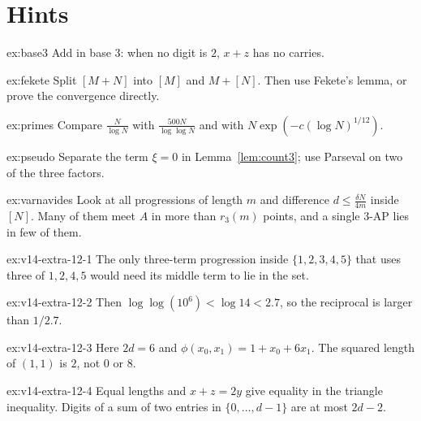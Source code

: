 \section{Hints}

\begin{hint}{ex:base3}
Add in base $3$: when no digit is $2$, $x+z$ has no carries.
\end{hint}

\begin{hint}{ex:fekete}
Split $[M+N]$ into $[M]$ and $M+[N]$. Then use Fekete's lemma, or prove the convergence directly.
\end{hint}

\begin{hint}{ex:primes}
Compare $\frac N{\log N}$ with $\frac{500N}{\log\log N}$ and with $N\exp(-c(\log N)^{1/12})$.
\end{hint}

\begin{hint}{ex:pseudo}
Separate the term $\xi=0$ in Lemma~\ref{lem:count3}; use Parseval on two of the three factors.
\end{hint}

\begin{hint}{ex:varnavides}
Look at all progressions of length $m$ and difference $d\le\frac{\delta N}{4m}$ inside $[N]$. Many of them meet $A$ in more than $r_3(m)$ points, and a single $3$-AP lies in few of them.
\end{hint}

\begin{hint}{ex:v14-extra-12-1}
The only three-term progression inside $\{1,2,3,4,5\}$ that uses three of $1,2,4,5$ would need its middle term to lie in the set.
\end{hint}

\begin{hint}{ex:v14-extra-12-2}
Then $\log\log(10^6)<\log14<2.7$, so the reciprocal is larger than $1/2.7$.
\end{hint}

\begin{hint}{ex:v14-extra-12-3}
Here $2d=6$ and $\phi(x_0,x_1)=1+x_0+6x_1$. The squared length of $(1,1)$ is $2$, not $0$ or $8$.
\end{hint}

\begin{hint}{ex:v14-extra-12-4}
Equal lengths and $x+z=2y$ give equality in the triangle inequality. Digits of a sum of two entries in $\{0,\dots,d-1\}$ are at most $2d-2$.
\end{hint}

